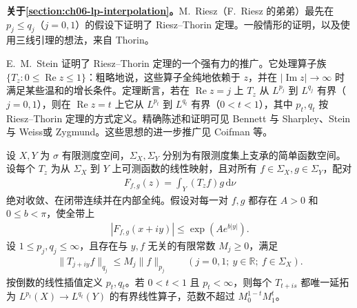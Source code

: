 \documentclass[../../main.tex]{subfiles}
\begin{document}
\textbf{关于\cref{section:ch06-lp-interpolation}。}M.~Riesz（F.~Riesz 的弟弟）\cite{folland-bib-118}最先在 $p_j\leqslant q_j$（$j=0,1$）的假设下证明了 Riesz–Thorin 定理。一般情形的证明，以及使用三线引理的想法，来自 Thorin\cite{folland-bib-149}。

E.~M.~Stein 证明了 Riesz–Thorin 定理的一个强有力的推广。它处理算子族 $\{T_z:0\leqslant\operatorname{Re}z\leqslant1\}$：粗略地说，这些算子全纯地依赖于 $z$，并在 $|\operatorname{Im}z|\to\infty$ 时满足某些温和的增长条件。定理断言，若在 $\operatorname{Re}z=j$ 上 $T_z$ 从 $L^{p_j}$ 到 $L^{q_j}$ 有界（$j=0,1$），则在 $\operatorname{Re}z=t$ 上它从 $L^{p_t}$ 到 $L^{q_t}$ 有界（$0<t<1$），其中 $p_t,q_t$ 按 Riesz–Thorin 定理的方式定义。精确陈述和证明可见 Bennett 与 Sharpley\cite[第4.3节]{folland-bib-15}、Stein 与 Weiss\cite[第V.4节]{folland-bib-142}或 Zygmund\cite[第XII.1节]{folland-bib-167}。这些思想的进一步推广见 Coifman 等\cite{folland-bib-28}。
\begin{proposition}\label{proposition:ch06-stein-uniform-edges}
设 $X,Y$ 为 $\sigma$ 有限测度空间，$\Sigma_X,\Sigma_Y$ 分别为有限测度集上支承的简单函数空间。设每个 $T_z$ 为从 $\Sigma_X$ 到 $Y$ 上可测函数的线性映射，且对所有 $f\in\Sigma_X,g\in\Sigma_Y$，配对
\begin{align*}
F_{f,g}(z)=\int_Y(T_zf)g\,\mathrm d\nu
\end{align*}
绝对收敛、在闭带连续并在内部全纯。假设对每一对 $f,g$ 都存在 $A>0$ 和 $0\leqslant b<\pi$，使全带上
\begin{align*}
|F_{f,g}(x+iy)|\leqslant\exp(Ae^{b|y|}).
\end{align*}
设 $1\leqslant p_j,q_j\leqslant\infty$，且存在与 $y,f$ 无关的有限常数 $M_j\geqslant0$，满足
\begin{align*}
\|T_{j+iy}f\|_{q_j}\leqslant M_j\|f\|_{p_j}
\qquad(j=0,1;\ y\in\mathbb R;\ f\in\Sigma_X).
\end{align*}
按倒数的线性插值定义 $p_t,q_t$。若 $0<t<1$ 且 $p_t<\infty$，则每个 $T_{t+is}$ 都唯一延拓为 $L^{p_t}(X)\to L^{q_t}(Y)$ 的有界线性算子，范数不超过 $M_0^{1-t}M_1^t$。
\end{proposition}
\end{document}
